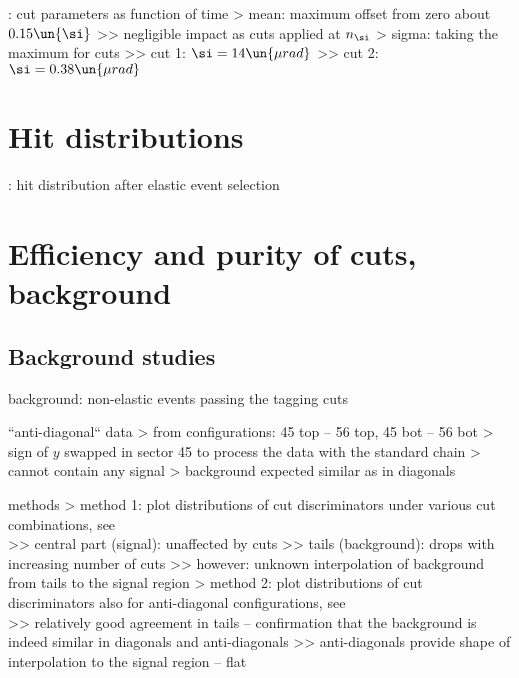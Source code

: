 \>  : cut parameters as function of time
\>> mean: maximum offset from zero about $0.15\un{\si}$
\>>> negligible impact as cuts applied at $n_\si$
\>> sigma: taking the maximum for cuts
\>>> cut 1: $\si = 14\un{\mu rad}$
\>>> cut 2: $\si = 0.38\un{\mu rad}$



\section{Hit distributions}

\> : hit distribution after elastic event selection



\section{Efficiency and purity of cuts, background}

\subsection{Background studies}

\> background: non-elastic events passing the tagging cuts

\> ``anti-diagonal`` data
\>> from configurations: 45 top -- 56 top, 45 bot -- 56 bot
\>> sign of $y$ swapped in sector 45 to process the data with the standard chain
\>> cannot contain any signal
\>> background expected similar as in diagonals

\> methods
\>> method 1: plot distributions of cut discriminators under various cut combinations, see\\ 
\>>> central part (signal): unaffected by cuts
\>>> tails (background): drops with increasing number of cuts
\>>> however: unknown interpolation of background from tails to the signal region
\>> method 2: plot distributions of cut discriminators also for anti-diagonal configurations, see\\ 
\>>> relatively good agreement in tails -- confirmation that the background is indeed similar in diagonals and anti-diagonals
\>>> anti-diagonals provide shape of interpolation to the signal region -- flat

